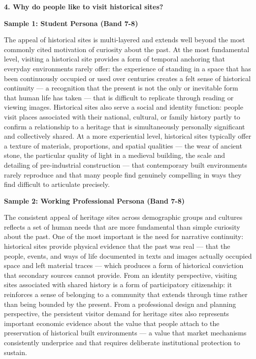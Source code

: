 \separator

\begin{ieltsquestion}
\textbf{4. Why do people like to visit historical sites?}
\end{ieltsquestion}
\textbf{Sample 1: Student Persona (Band 7-8)}

The appeal of historical sites is multi-layered and extends well beyond the most commonly cited motivation of curiosity about the past. At the most fundamental level, visiting a historical site provides a form of temporal anchoring that everyday environments rarely offer: the experience of standing in a space that has been continuously occupied or used over centuries creates a felt sense of historical continuity — a recognition that the present is not the only or inevitable form that human life has taken — that is difficult to replicate through reading or viewing images. Historical sites also serve a social and identity function: people visit places associated with their national, cultural, or family history partly to confirm a relationship to a heritage that is simultaneously personally significant and collectively shared. At a more experiential level, historical sites typically offer a texture of materials, proportions, and spatial qualities — the wear of ancient stone, the particular quality of light in a medieval building, the scale and detailing of pre-industrial construction — that contemporary built environments rarely reproduce and that many people find genuinely compelling in ways they find difficult to articulate precisely.

\textbf{Sample 2: Working Professional Persona (Band 7-8)}

The consistent appeal of heritage sites across demographic groups and cultures reflects a set of human needs that are more fundamental than simple curiosity about the past. One of the most important is the need for narrative continuity: historical sites provide physical evidence that the past was real — that the people, events, and ways of life documented in texts and images actually occupied space and left material traces — which produces a form of historical conviction that secondary sources cannot provide. From an identity perspective, visiting sites associated with shared history is a form of participatory citizenship: it reinforces a sense of belonging to a community that extends through time rather than being bounded by the present. From a professional design and planning perspective, the persistent visitor demand for heritage sites also represents important economic evidence about the value that people attach to the preservation of historical built environments — a value that market mechanisms consistently underprice and that requires deliberate institutional protection to sustain.

